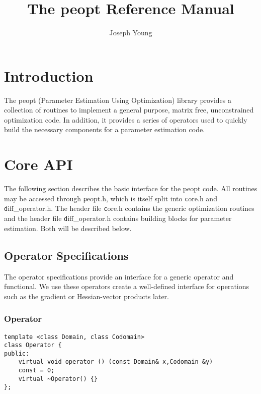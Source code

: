 \documentclass{article}
\title{The peopt Reference Manual}
\author{Joseph Young}
\begin{document}
\lstset{language=C++}


\maketitle

\section{Introduction}

	The peopt (Parameter Estimation Using Optimization) library provides a collection of routines to implement a general purpose, matrix free, unconstrained optimization code.  In addition, it provides a series of operators used to quickly build the necessary components for a parameter estimation code.

\section{Core API}

	The following section describes the basic interface for the peopt code.  All routines may be accessed through {\texttt peopt.h}, which is itself split into {\texttt core.h} and {\texttt diff\_operator.h}.  The header file {\texttt core.h} contains the generic optimization routines and the header file {\texttt diff\_operator.h} contains building blocks for parameter estimation.  Both will be described below.

\subsection{Operator Specifications}

	The operator specifications provide an interface for a generic operator and functional.  We use these operators create a well-defined interface for operations such as the gradient or Hessian-vector products later.

\subsubsection{Operator}

\begin{flushleft}
\begin{lstlisting}
template <class Domain, class Codomain>
class Operator {
public:
    virtual void operator () (const Domain& x,Codomain &y)
	const = 0;
    virtual ~Operator() {}
};
\end{lstlisting}
\end{flushleft}
\end{document}
